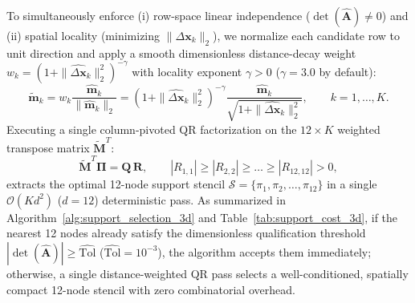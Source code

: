 \documentclass[preprint,12pt]{elsarticle}
\begin{document}
To simultaneously enforce (i) row-space linear independence ($\det(\widehat{\mathbf{A}}) \neq 0$) and (ii) spatial locality (minimizing $\|\Delta\mathbf{x}_k\|_2$), we normalize each candidate row to unit direction and apply a smooth dimensionless distance-decay weight $w_k = (1 + \|\widehat{\Delta\mathbf{x}}_k\|_2^2)^{-\gamma}$ with locality exponent $\gamma > 0$ ($\gamma = 3.0$ by default):
\begin{equation}
    \widetilde{\mathbf{m}}_k = w_k \frac{\widehat{\mathbf{m}}_k}{\|\widehat{\mathbf{m}}_k\|_2} = \left(1 + \|\widehat{\Delta\mathbf{x}}_k\|_2^2\right)^{-\gamma} \frac{\widehat{\mathbf{m}}_k}{\sqrt{1 + \|\widehat{\Delta\mathbf{x}}_k\|_2^2}}, \qquad k = 1, \dots, K.
    \label{eq:weighted_qr_row_3d}
\end{equation}
Executing a single column-pivoted QR factorization on the $12 \times K$ weighted transpose matrix $\widetilde{\mathbf{M}}^T$:
\begin{equation}
    \widetilde{\mathbf{M}}^T \bm{\Pi} = \mathbf{Q}\,\mathbf{R}, \qquad |R_{1,1}| \ge |R_{2,2}| \ge \dots \ge |R_{12,12}| > 0,
    \label{eq:qr_factorization_3d}
\end{equation}
extracts the optimal 12-node support stencil $\mathcal{S} = \{\pi_1, \pi_2, \dots, \pi_{12}\}$ in a single $\mathcal{O}(K d^2)$ ($d=12$) deterministic pass. As summarized in Algorithm~\ref{alg:support_selection_3d} and Table~\ref{tab:support_cost_3d}, if the nearest 12 nodes already satisfy the dimensionless qualification threshold $|\det(\widehat{\mathbf{A}})| \ge \widehat{\text{Tol}}$ ($\widehat{\text{Tol}} = 10^{-3}$), the algorithm accepts them immediately; otherwise, a single distance-weighted QR pass selects a well-conditioned, spatially compact 12-node stencil with zero combinatorial overhead.
\end{document}
